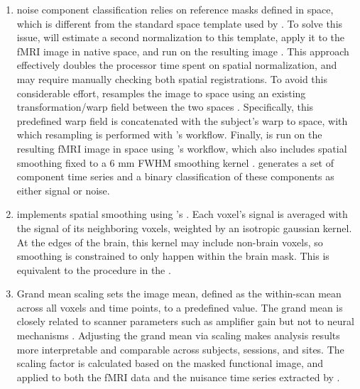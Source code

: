 \begin{enumerate}[leftmargin=*]

\item

 noise component classification
\parencite{10.1016/j.neuroimage.2015.02.064} relies on reference masks defined
in  space, which is different from the standard space
template used by . To solve this issue,  will
estimate a second normalization to this template, apply it to the fMRI
image in native space, and run  on the resulting image
\parencite{10.1101/2021.02.10.430678}. This approach effectively doubles the
processor time spent on spatial normalization, and may require manually
checking both spatial registrations. To avoid this considerable effort,
 resamples the image to  space using
an existing transformation/warp field between the two spaces
\parencite{horn_transform}. Specifically, this predefined warp field is
concatenated with the subject's warp to  space,
with which resampling is performed with 's
 workflow. Finally,  is run on the
resulting fMRI image in  space using
's  workflow, which also includes spatial
smoothing fixed to a 6 mm FWHM smoothing kernel
\parencite{10.1016/j.neuroimage.2015.02.064}.  generates a set
of component time series and a binary classification of these components as
either signal or noise.

\item

 implements spatial smoothing using 's
 \parencite{10.1006/cbmr.1996.0014}. Each voxel's signal is
averaged with the signal of its neighboring voxels, weighted by an
isotropic gaussian kernel. At the edges of the brain, this kernel may
include non-brain voxels, so smoothing is constrained to only happen within
the brain mask. This is equivalent to the procedure in the 
\parencite{10.1016/j.neuroimage.2013.04.127}.

\item\label{itm:grandmean}

Grand mean scaling sets the image mean, defined as the within-scan mean
across all voxels and time points, to a predefined value. The grand mean is
closely related to scanner parameters such as amplifier gain but not to
neural mechanisms \parencite{10.1006/nimg.2002.1226}. Adjusting the grand mean
via scaling makes analysis results more interpretable and comparable across
subjects, sessions, and sites. The scaling factor is calculated based on
the masked functional image, and applied to both the fMRI data and the
nuisance time series extracted by .


\end{enumerate}
